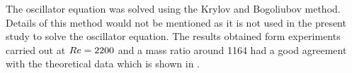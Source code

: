 The oscillator equation was solved using the Krylov and Bogoliubov method. Details of this method would not be mentioned as it is not used in the present study to solve the oscillator equation. The results obtained form experiments carried out at $Re=2200$ and a mass ratio around 1164 had a good agreement with the theoretical data which is shown in .

  


    

     











